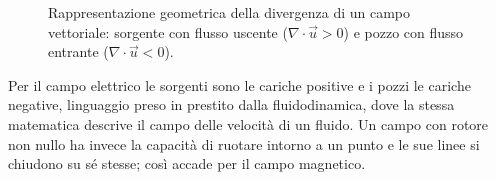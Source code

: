\documentclass[main.tex]{subfiles}
\begin{document}
\begin{figure}[htbp]
	\caption{Rappresentazione geometrica della divergenza di un campo vettoriale: sorgente con flusso uscente ($\nabla \cdot \vec{u} > 0$) e pozzo con flusso entrante ($\nabla \cdot \vec{u} < 0$).}
	\label{fig:pre:divergenza_sorgente_pozzo}
\end{figure}

Per il campo elettrico le sorgenti sono le cariche positive e i pozzi le cariche negative, linguaggio preso in prestito dalla fluidodinamica, dove la stessa matematica descrive il campo delle velocità di un fluido. Un campo con rotore non nullo ha invece la capacità di ruotare intorno a un punto e le sue linee si chiudono su sé stesse; così accade per il campo magnetico. 
\end{document}
